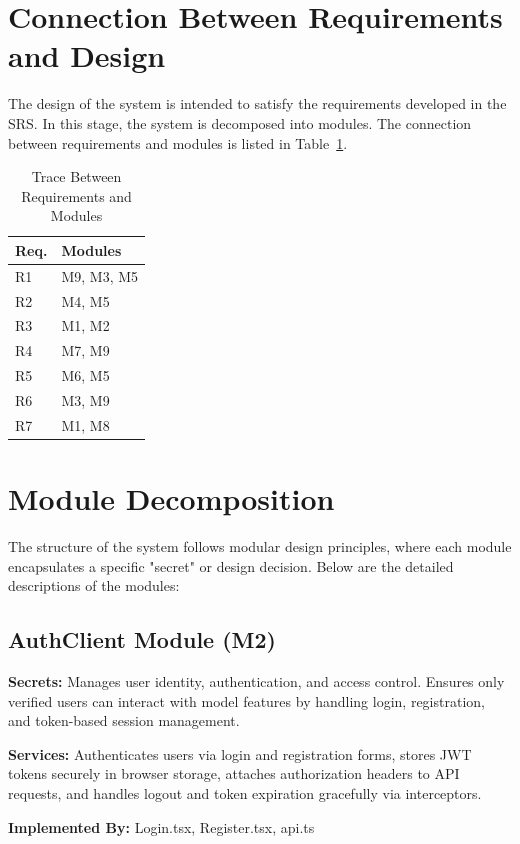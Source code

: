 \documentclass[12pt, titlepage]{article}
\begin{document}
\newpage

\section{Connection Between Requirements and Design} \label{SecConnection}
The design of the system is intended to satisfy the requirements developed in the SRS. In this stage, the system is decomposed into modules. The connection between requirements and modules is listed in Table~\ref{TblRT}.

\begin{table}[h!]
\centering
\begin{tabular}{|l|l|}
\hline
\textbf{Req.} & \textbf{Modules} \\
\hline
R1 & M9, M3, M5 \\
R2 & M4, M5 \\
R3 & M1, M2 \\
R4 & M7, M9 \\
R5 & M6, M5 \\
R6 & M3, M9 \\
R7 & M1, M8 \\
\hline
\end{tabular}
\caption{Trace Between Requirements and Modules}
\label{TblRT}
\end{table}


\section{Module Decomposition}

The structure of the system follows modular design principles, where each module encapsulates a specific "secret" or design decision. Below are the detailed descriptions of the modules:

\subsection{AuthClient Module (M2)}

\textbf{Secrets:} Manages user identity, authentication, and access control. Ensures only verified users can interact with model features by handling login, registration, and token-based session management.

\textbf{Services:} Authenticates users via login and registration forms, stores JWT tokens securely in browser storage, attaches authorization headers to API requests, and handles logout and token expiration gracefully via interceptors.

\textbf{Implemented By:} Login.tsx, Register.tsx, api.ts
\end{document}
